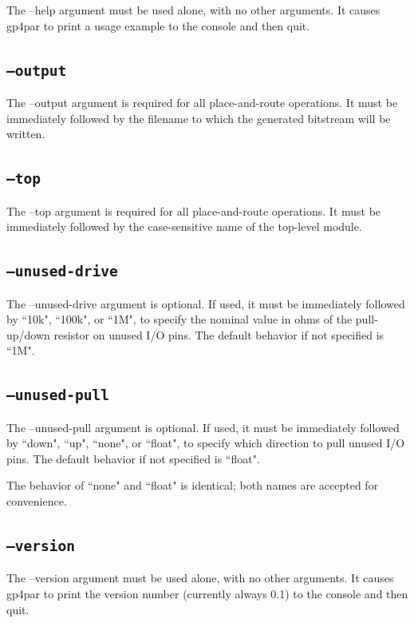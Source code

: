 \documentclass[11pt]{article}
\begin{document}
The --help argument must be used alone, with no other arguments. It causes gp4par to print a usage example to the 
console and then quit.

\subsection{\texttt{--output}}

The --output argument is required for all place-and-route operations. It must be immediately followed by the 
filename to which the generated bitstream will be written.

\subsection{\texttt{--top}}

The --top argument is required for all place-and-route operations. It must be immediately followed by the 
case-sensitive name of the top-level module.

\subsection{\texttt{--unused-drive}}

The --unused-drive argument is optional. If used, it must be immediately followed by ``10k", ``100k", or ``1M", to 
specify the nominal value in ohms of the pull-up/down resistor on unused I/O pins. The default behavior if not 
specified is ``1M".

\subsection{\texttt{--unused-pull}}

The --unused-pull argument is optional. If used, it must be immediately followed by ``down", ``up", ``none", or 
``float", to specify which direction to pull unused I/O pins. The default behavior if not specified is ``float".

The behavior of ``none" and ``float" is identical; both names are accepted for convenience.

\subsection{\texttt{--version}}

The --version argument must be used alone, with no other arguments. It causes gp4par to print the version number 
(currently always 0.1) to the console and then quit.
\end{document}
